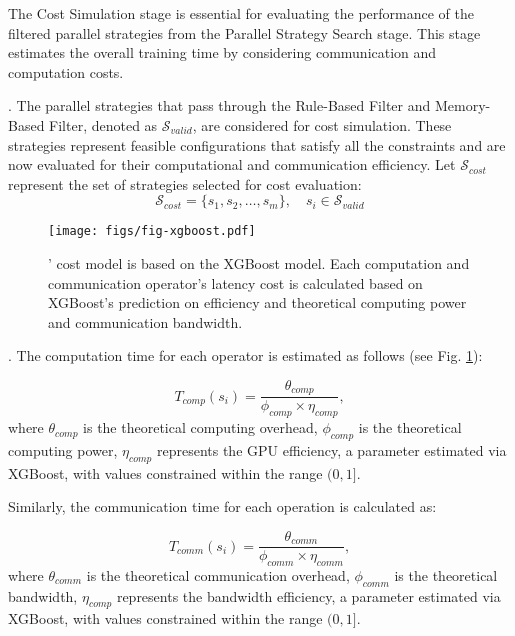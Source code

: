 The Cost Simulation stage is essential for evaluating the performance of the filtered parallel strategies from the Parallel Strategy Search stage. This stage estimates the overall training time by considering communication and computation costs.

. The parallel strategies that pass through the Rule-Based Filter and Memory-Based Filter, denoted as $\mathcal{S}_{valid}$, are considered for cost simulation. These strategies represent feasible configurations that satisfy all the constraints and are now evaluated for their computational and communication efficiency. Let $\mathcal{S}_{cost}$ represent the set of strategies selected for cost evaluation:
\begin{equation}
    \mathcal{S}_{cost} = \{ s_1, s_2, \dots, s_m \}, \quad s_i \in \mathcal{S}_{valid}
\end{equation}

\begin{figure}[htb!]
\centering
\texttt{[image: figs/fig-xgboost.pdf]}
\caption{
\sysname' cost model is based on the XGBoost model.
Each computation and communication operator's latency cost is calculated based on XGBoost's prediction on efficiency and theoretical computing power and communication bandwidth.
}
\label{fig:xgboost}
\end{figure}

. The computation time for each operator is estimated as follows (see Fig. \ref{fig:xgboost}):

\begin{equation}
T_{comp}(s_i) = \frac{\theta_{comp}}{ \phi_{comp} \times \eta_{comp}},
\end{equation}
where $\theta_{comp}$ is the theoretical computing overhead, $\phi_{comp}$ is the theoretical computing power, $\eta_{comp}$ represents the GPU efficiency, a parameter estimated via XGBoost, with values constrained within the range $(0, 1]$.

Similarly, the communication time for each operation is calculated as:

\begin{equation}
T_{comm}(s_i) = \frac{\theta_{comm}}{ \phi_{comm} \times \eta_{comm}},
\end{equation}
where $\theta_{comm}$ is the theoretical communication overhead, $\phi_{comm}$ is the theoretical bandwidth, $\eta_{comp}$ represents the bandwidth efficiency, a parameter estimated via XGBoost, with values constrained within the range $(0, 1]$.


